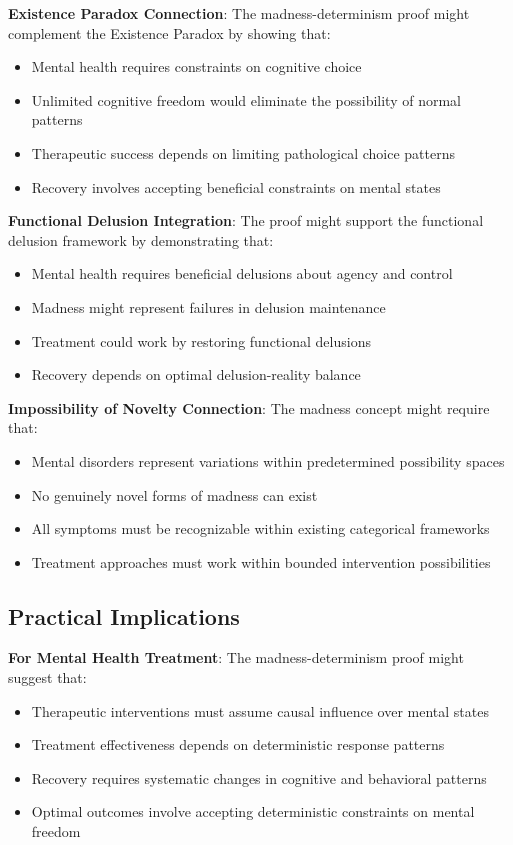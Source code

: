 \documentclass[12pt]{article}
\begin{document}
\textbf{Existence Paradox Connection}: The madness-determinism proof might complement the Existence Paradox by showing that:
\begin{itemize}
\item Mental health requires constraints on cognitive choice
\item Unlimited cognitive freedom would eliminate the possibility of normal patterns
\item Therapeutic success depends on limiting pathological choice patterns
\item Recovery involves accepting beneficial constraints on mental states
\end{itemize}

\textbf{Functional Delusion Integration}: The proof might support the functional delusion framework by demonstrating that:
\begin{itemize}
\item Mental health requires beneficial delusions about agency and control
\item Madness might represent failures in delusion maintenance
\item Treatment could work by restoring functional delusions
\item Recovery depends on optimal delusion-reality balance
\end{itemize}

\textbf{Impossibility of Novelty Connection}: The madness concept might require that:
\begin{itemize}
\item Mental disorders represent variations within predetermined possibility spaces
\item No genuinely novel forms of madness can exist
\item All symptoms must be recognizable within existing categorical frameworks
\item Treatment approaches must work within bounded intervention possibilities
\end{itemize}

\subsection{Practical Implications}

\textbf{For Mental Health Treatment}: The madness-determinism proof might suggest that:
\begin{itemize}
\item Therapeutic interventions must assume causal influence over mental states
\item Treatment effectiveness depends on deterministic response patterns
\item Recovery requires systematic changes in cognitive and behavioral patterns
\item Optimal outcomes involve accepting deterministic constraints on mental freedom
\end{itemize}
\end{document}
